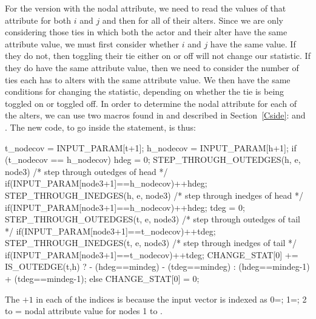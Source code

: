 \documentclass[nojss]{jss}
\begin{document}
For the version with the nodal attribute, we need to read the values of that attribute for both $i$ and $j$ and then for all of their alters.  Since we are only considering those ties in which both the actor and their alter have the same attribute value, we must first consider whether $i$ and $j$ have the same value.  If they do not, then toggling their tie either on or off will not change our statistic. If they do have the same attribute value, then we need to consider the number of ties each has to alters with the same attribute value. We then have the same conditions for changing the statistic, depending on whether the tie is being toggled on or toggled off. In order to determine the nodal attribute for each of the alters, we can use two macros found in  and described in Section~\ref{Cside}:  and . The new code, to go inside the  statement, is thus:
\begin{CodeChunk}
\begin{CodeInput}
      t_nodecov = INPUT_PARAM[t+1];
      h_nodecov = INPUT_PARAM[h+1];
      if (t_nodecov == h_nodecov) {
        hdeg = 0;
        STEP_THROUGH_OUTEDGES(h, e, node3) { /* step through outedges of head */
          if(INPUT_PARAM[node3+1]==h_nodecov){++hdeg;}
        }
        STEP_THROUGH_INEDGES(h, e, node3) { /* step through inedges of head */
          if(INPUT_PARAM[node3+1]==h_nodecov){++hdeg;}
        }
        tdeg = 0;
        STEP_THROUGH_OUTEDGES(t, e, node3) { /* step through outedges of tail */
          if(INPUT_PARAM[node3+1]==t_nodecov){++tdeg;}
        }
        STEP_THROUGH_INEDGES(t, e, node3) { /* step through inedges of tail */
          if(INPUT_PARAM[node3+1]==t_nodecov){++tdeg;}
        }
        CHANGE_STAT[0] += IS_OUTEDGE(t,h) ?
          - (hdeg==mindeg) - (tdeg==mindeg) :
          (hdeg==mindeg-1) + (tdeg==mindeg-1);
      }else{
        CHANGE_STAT[0] = 0;
      }

\end{CodeInput}
\end{CodeChunk}
The $+1$ in each of the  indices is because the input vector
is indexed as 0=; 1=; 2 to  = nodal
attribute value for nodes 1 to .
\end{document}
